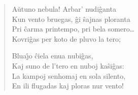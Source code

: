 \begin{verse}
                \vin  A\u utuno nebula! Arbar' nudi\^ganta\\
               Kun vento bruegas, \^gi \^sajnas ploranta\\
               Pri \^carma printempo, pri bela somero\dots\\
               Kovri\^gas per koto de pluvo la tero;

               Blua\^{\j}o \^ciela enua nubi\^gas,\\
               Kaj suno de l'tero en nuboj ka\^si\^gas:\\
               La kampoj senhomaj en sola silento,\\
               En ili flugadas kaj ploras nur vento!

\end{verse}

\smallrule{}
